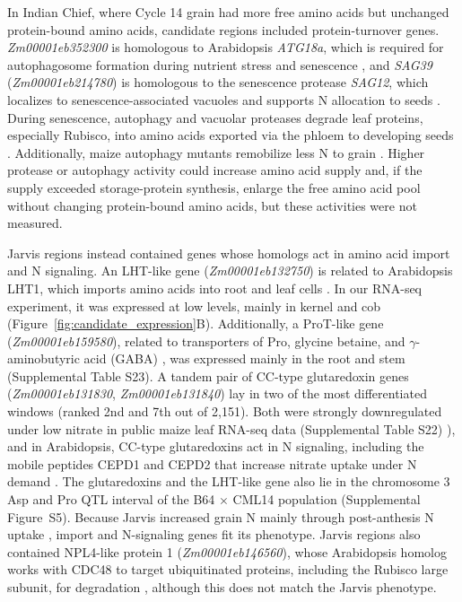 \documentclass[namedate,unnumsec,webpdf,contemporary,large]{oup-authoring-template}
\begin{document}
In Indian Chief, where Cycle 14 grain had more free amino acids but unchanged protein-bound amino acids, candidate regions included protein-turnover genes. \textit{Zm00001eb352300} is homologous to Arabidopsis \textit{ATG18a}, which is required for autophagosome formation during nutrient stress and senescence \citep{Xiong2005ATG18a}, and \textit{SAG39} (\textit{Zm00001eb214780}) is homologous to the senescence protease \textit{SAG12}, which localizes to senescence-associated vacuoles and supports N allocation to seeds \citep{Otegui2005SAV, James2018SAG12}. During senescence, autophagy and vacuolar proteases degrade leaf proteins, especially Rubisco, into amino acids exported via the phloem to developing seeds \citep{Feller2008Rubiscolytics, Have2017NRemobilization}. Additionally, maize autophagy mutants remobilize less N to grain \citep{Li2015MaizeAutophagy}. Higher protease or autophagy activity could increase amino acid supply and, if the supply exceeded storage-protein synthesis, enlarge the free amino acid pool without changing protein-bound amino acids, but these activities were not measured.

Jarvis regions instead contained genes whose homologs act in amino acid import and N signaling. An LHT-like gene (\textit{Zm00001eb132750}) is related to Arabidopsis LHT1, which imports amino acids into root and leaf cells \citep{Hirner2006LHT1}. In our  RNA-seq experiment, it was expressed at low levels, mainly in kernel and cob (Figure~\ref{fig:candidate_expression}B). Additionally, a ProT-like gene (\textit{Zm00001eb159580}), related to transporters of Pro, glycine betaine, and $\gamma$-aminobutyric acid (GABA) \citep{Lehmann2011ProT}, was expressed mainly in the root and stem (Supplemental Table S23). A tandem pair of CC-type glutaredoxin genes (\textit{Zm00001eb131830}, \textit{Zm00001eb131840}) lay in two of the most differentiated windows (ranked 2nd and 7th out of 2,151). Both were strongly downregulated under low nitrate in public maize leaf RNA-seq data (Supplemental Table S22) \citep{MaizExpressN, Mu2017LN, Guo2022LN, Ma2021LN, TorresRodriguez2021LN, AlonsoNieves2022LN, Wang2025NRT25}), and in Arabidopsis, CC-type glutaredoxins act in N signaling, including the mobile peptides CEPD1 and CEPD2 that increase nitrate uptake under N demand \citep{Patterson2016GRX, Ohkubo2017CEPD}. The glutaredoxins and the LHT-like gene also lie in the chromosome 3 Asp and Pro QTL interval of the B64 $\times$ CML14 population (Supplemental Figure~S5). Because Jarvis increased grain N mainly through post-anthesis N uptake \citep{Moll1994}, import and N-signaling genes fit its phenotype. Jarvis regions also contained NPL4-like protein 1 (\textit{Zm00001eb146560}), whose Arabidopsis homolog works with CDC48 to target ubiquitinated proteins, including the Rubisco large subunit, for degradation \citep{Li2022CDC48}, although this does not match the Jarvis phenotype.
\end{document}
